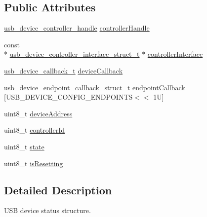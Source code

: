 \subsection*{Public Attributes}
\begin{DoxyCompactItemize}
\item 
\hyperlink{group__usb__device__controller__driver_gaec03ce2e4732aa876cd2a91cf8e93b5b}{usb\-\_\-device\-\_\-controller\-\_\-handle} \hyperlink{struct__usb__device__struct_a0590c24c845667193936f0a446d08cb9}{controller\-Handle}
\item 
const \\*
\hyperlink{group__usb__device__controller__driver_ga634411452886b58586be873d8d631a3b}{usb\-\_\-device\-\_\-controller\-\_\-interface\-\_\-struct\-\_\-t} $\ast$ \hyperlink{struct__usb__device__struct_aee4a13057112d36193a654fef978f4ae}{controller\-Interface}
\item 
\hyperlink{group__usb__device__driver_gac8ba48f1dea2c0b099092576ad48fb4e}{usb\-\_\-device\-\_\-callback\-\_\-t} \hyperlink{struct__usb__device__struct_a9b9546705d3f2bbccf1a05605cdbf869}{device\-Callback}
\item 
\hyperlink{group__usb__device__driver_ga0fcee893200ced24dbff370f38c16573}{usb\-\_\-device\-\_\-endpoint\-\_\-callback\-\_\-struct\-\_\-t} \hyperlink{struct__usb__device__struct_a29eda36612811852d13e534b86ac927d}{endpoint\-Callback} \mbox{[}U\-S\-B\-\_\-\-D\-E\-V\-I\-C\-E\-\_\-\-C\-O\-N\-F\-I\-G\-\_\-\-E\-N\-D\-P\-O\-I\-N\-T\-S$<$$<$ 1\-U\mbox{]}
\item 
uint8\-\_\-t \hyperlink{struct__usb__device__struct_abae4041d3d8b46a4d06954cd13061424}{device\-Address}
\item 
uint8\-\_\-t \hyperlink{struct__usb__device__struct_ad402e79419d37fc72e7f71fb10ec3289}{controller\-Id}
\item 
uint8\-\_\-t \hyperlink{struct__usb__device__struct_a9fa0b5304d25ba7cec0517ae05cad566}{state}
\item 
uint8\-\_\-t \hyperlink{struct__usb__device__struct_a1df9a5fa5845e9b0adca6733e87a82d6}{is\-Resetting}
\end{DoxyCompactItemize}


\subsection{Detailed Description}
U\-S\-B device status structure. 

